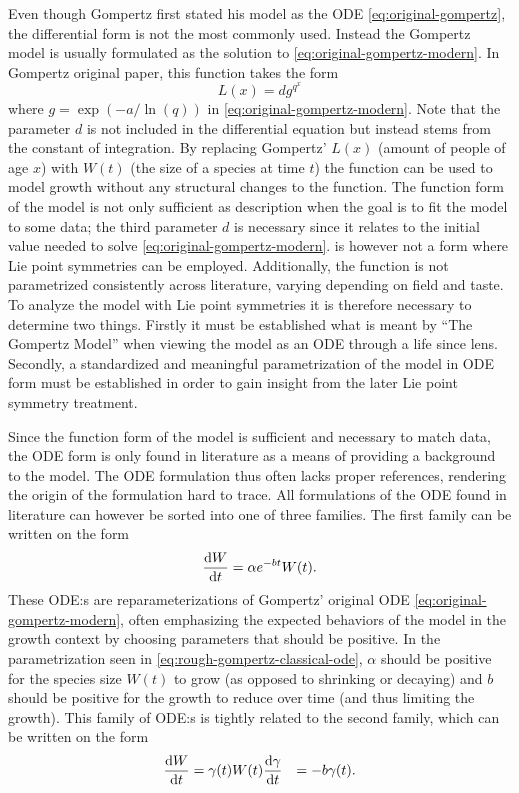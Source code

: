 Even though Gompertz first stated his model as the ODE \ref{eq:original-gompertz}, the differential form is not the most commonly used.
Instead the Gompertz model is usually formulated as the solution to \cref{eq:original-gompertz-modern}.
In Gompertz original paper, this function takes the form
\begin{equation} \label{eq:original-gompertz-solution}
  L(x) = d g^{q^x}
\end{equation}
where \(g = \exp(-a/\ln(q))\) in \cref{eq:original-gompertz-modern}.
Note that the parameter \(d\) is not included in the differential equation but instead stems from the constant of integration.
By replacing Gompertz' \(L(x)\) (amount of people of age \(x\)) with \(W(t)\) (the size of a species at time \(t\)) the function can be used to model growth without any structural changes to the function.
The function form of the model is not only sufficient as description when the goal is to fit the model to some data; the third parameter \(d\) is necessary since it relates to the initial value needed to solve \cref{eq:original-gompertz-modern}.
 is however not a form where Lie point symmetries can be employed.
Additionally, the function is not parametrized consistently across literature, varying depending on field and taste.
To analyze the model with Lie point symmetries it is therefore necessary to determine two things.
Firstly it must be established what is meant by \enquote{The Gompertz Model} when viewing the model as an ODE through a life since lens.
Secondly, a standardized and meaningful parametrization of the model in ODE form must be established in order to gain insight from the later Lie point symmetry treatment.

Since the function form of the model is sufficient and necessary to match data, the ODE form is only found in literature as a means of providing a background to the model.
The ODE formulation thus often lacks proper references, rendering the origin of the formulation hard to trace.
All formulations of the ODE found in literature can however be sorted into one of three families.
The first family can be written on the form
\begin{equation} \label{eq:rough-gompertz-classical-ode}
  \dv{W}{t} = \alpha e^{-b t} W(t).
\end{equation}
These ODE:s are reparameterizations of Gompertz' original ODE \ref{eq:original-gompertz-modern}, often emphasizing the expected behaviors of the model in the growth context by choosing parameters that should be positive.
In the parametrization seen in \cref{eq:rough-gompertz-classical-ode}, \(\alpha\) should be positive for the species size \(W(t)\) to grow (as opposed to shrinking or decaying) and \(b\) should be positive for the growth to reduce over time (and thus limiting the growth).
This family of ODE:s is tightly related to the second family, which can be written on the form
\begin{align}
  \dv{W}{t} &= \gamma(t) W(t)
  \dv{\gamma}{t} &= -b \gamma(t).
\end{align}


